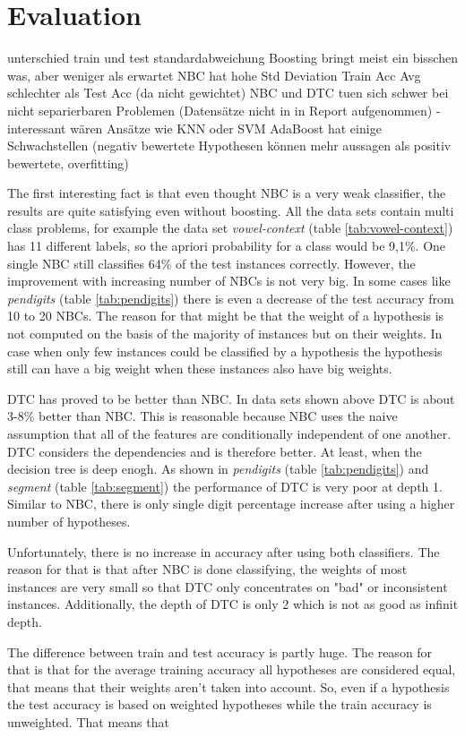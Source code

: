 \chapter{Evaluation}
\label{ch:evaluation}

unterschied train und test
standardabweichung
Boosting bringt meist ein bisschen was, aber weniger als erwartet
NBC hat hohe Std Deviation
Train Acc Avg schlechter als Test Acc (da nicht gewichtet)
NBC und DTC tuen sich schwer bei nicht separierbaren Problemen (Datensätze nicht in in Report aufgenommen) - interessant wären Ansätze wie KNN oder SVM
AdaBoost hat einige Schwachstellen (negativ bewertete Hypothesen können mehr aussagen als positiv bewertete, overfitting)

The first interesting fact is that even thought NBC is a very weak classifier, the results are quite satisfying even without boosting. 
All the data sets contain multi class problems, for example the data set \emph{vowel-context} (table \ref{tab:vowel-context}) 
has 11 different labels, so the apriori probability for a class would be 9,1\%.
One single NBC still classifies 64\% of the test instances correctly. However, the improvement with increasing number of NBCs
is not very big. In some cases like \emph{pendigits} (table \ref{tab:pendigits}) there is even a decrease of the test accuracy from 10 to 20 NBCs.
The reason for that might be that the weight of a hypothesis is not computed on the basis of the majority of instances but on their weights. 
In case when only few instances could be classified by a hypothesis the hypothesis still can have a big weight when these instances also have big weights.

DTC has proved to be better than NBC. In data sets shown above DTC is about 3-8\% better than NBC. This is reasonable because NBC uses
the naive assumption that all of the features are conditionally independent of one another. DTC considers the dependencies and is
therefore better. At least, when the decision tree is deep enogh. As shown in \emph{pendigits} (table \ref{tab:pendigits}) and 
\emph{segment} (table \ref{tab:segment}) the performance of DTC is very poor at depth 1. Similar to NBC, there is only single digit
percentage increase after using a higher number of hypotheses.

Unfortunately, there is no increase in accuracy after using both classifiers. The reason for that is that after NBC is done 
classifying, the weights of most instances are very small so that DTC only concentrates on "bad" or inconsistent instances. 
Additionally, the depth of DTC is only 2 which is not as good as infinit depth.

The difference between train and test accuracy is partly huge. The reason for that is that for the average training accuracy all 
hypotheses are considered equal, that means that their weights aren't taken into account. So, even if a hypothesis
the test accuracy is based on weighted 
hypotheses while the train accuracy is unweighted. That means that 